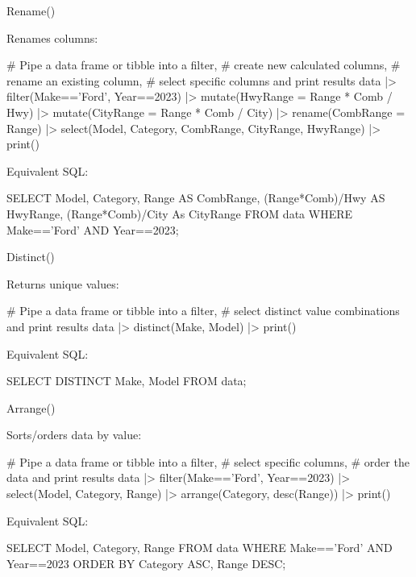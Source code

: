 \documentclass[ignorenonframetext,xcolor=x11names]{beamer}
\begin{document}
\begin{frame}[fragile]{Rename()}

Renames columns:

\begin{Rcode}
# Pipe a data frame or tibble into a filter,
# create new calculated columns,
# rename an existing column,
# select specific columns and print results
data |> 
  filter(Make=='Ford', Year==2023) |> 
  mutate(HwyRange = Range * Comb / Hwy) |>
  mutate(CityRange = Range * Comb / City) |>
  rename(CombRange = Range) |>
  select(Model, Category, CombRange, CityRange, HwyRange) |>
  print()
\end{Rcode}

Equivalent SQL:

\begin{sqlcode}
SELECT Model, Category, 
      Range AS CombRange,
      (Range*Comb)/Hwy AS HwyRange, 
      (Range*Comb)/City As CityRange
   FROM data 
   WHERE Make=='Ford' AND Year==2023;
\end{sqlcode}
\end{frame}

\begin{frame}[fragile]{Distinct()}

Returns unique values:

\begin{Rcode}
# Pipe a data frame or tibble into a filter,
# select distinct value combinations and print results
data |> 
  distinct(Make, Model) |>
  print()
\end{Rcode}

Equivalent SQL:

\begin{sqlcode}
SELECT DISTINCT Make, Model 
  FROM data;
\end{sqlcode}
\end{frame}

\begin{frame}[fragile]{Arrange()}

Sorts/orders data by value:

\begin{Rcode}
# Pipe a data frame or tibble into a filter,
# select specific columns,
# order the data and print results
data |> 
  filter(Make=='Ford', Year==2023) |> 
  select(Model, Category, Range) |>
  arrange(Category, desc(Range)) |>
  print()
\end{Rcode}

Equivalent SQL:

\begin{sqlcode}
SELECT Model, Category, Range
   FROM data 
   WHERE Make=='Ford' AND Year==2023
   ORDER BY Category ASC, Range DESC;
\end{sqlcode}
\end{frame}
\end{document}
